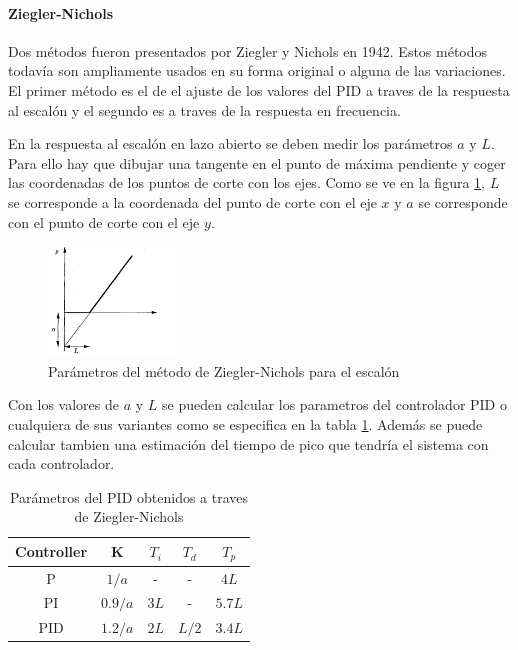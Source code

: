 \documentclass{book}
\begin{document}
		\paragraph{Ziegler-Nichols}

Dos m\'etodos fueron presentados por Ziegler y Nichols en 1942. Estos m\'etodos todav\'ia son ampliamente usados en su forma original o alguna de las variaciones. El primer m\'etodo es el de el ajuste de los valores del PID a traves de la respuesta al escal\'on y el segundo es a traves de la respuesta en frecuencia. \par 

En la respuesta al escal\'on en lazo abierto se deben medir los par\'ametros $a$ y $L$. Para ello hay que dibujar una tangente en el punto de m\'axima pendiente y coger las coordenadas de los puntos de corte con los ejes. Como se ve en la figura \ref{ZNstep}, $L$ se corresponde a la coordenada del punto de corte con el eje $x$ y $a$ se corresponde con el punto de corte con el eje $y$. 

\begin{figure}[h!]
\centering
\includegraphics[width=0.3\textwidth]{ZNstep.PNG}
\caption{Par\'ametros del m\'etodo de Ziegler-Nichols para el escal\'on \cite{PIDbook}}
\label{ZNstep}
\end{figure}\par

Con los valores de $a$ y $L$ se pueden calcular los parametros del controlador PID o cualquiera de sus variantes como se especifica en la tabla \ref{ta:ZNstep}. Adem\'as se puede calcular tambien una estimaci\'on del tiempo de pico que tendr\'ia el sistema con cada controlador. \par 

\begin{table}[h!]
\centering
\caption{Par\'ametros del PID obtenidos a traves de Ziegler-Nichols \cite{PIDbook}}
\label{ta:ZNstep}
\begin{tabular}{c|cccc}
Controller & K     & $T_{i}$ & $T_{d}$ & $T_{p}$ \\ \hline
P          & $1/a$   & -        & -        & $4L$       \\
PI         & $0.9/a$ & $3L$       & -        & $5.7L$     \\
PID        & $1.2/a$ & $2L$       & $L/2$      & $3.4L$    
\end{tabular}
\end{table}
\end{document}
